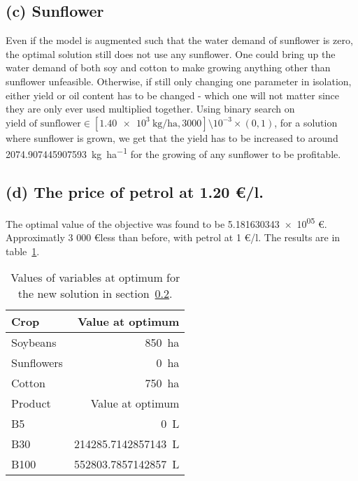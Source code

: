 \documentclass{article}
\begin{document}
\subsection{(c) Sunflower}
Even if the model is augmented such that
the water demand of sunflower is zero,
the optimal solution still does not use any sunflower.
One could bring up the water demand of both soy and cotton
to make growing anything other than sunflower unfeasible.
Otherwise, if still only changing one parameter in isolation,
either yield or oil content has to be changed -
which one will not matter since they are only ever used multiplied together.
Using binary search on
$\text{yield of sunflower} \in [\SI{1.40e3}{\kilo\gram\per\hectare}, 3000] \setminus 10^{-3} \times (0, 1)$,
for a solution where sunflower is grown,
we get that the yield has to be increased to around \SI[round-precision=6]{2074.907445907593}{\kilo\gram\per\hectare}
for the growing of any sunflower to be profitable.

\subsection{(d) The price of petrol at 1.20 \euro/l.}\label{sec:3d}
The optimal value of the objective was found to be
\num{5.181630343e+05} \euro. 
Approximatly 3 000 \euro less than before, with petrol at 1 \euro/l.
The results are in table~\ref{tab:new_values}.

\begin{table}
	\centering
	\caption{Values of variables at optimum for the new solution in section~\ref{sec:3d}. \label{tab:new_values}}
	\begin{tabular}{l r}
		\toprule
		Crop       & Value at optimum               \\
		\midrule
		Soybeans   & \SI{850}{\hectare}             \\
		Sunflowers & \SI{0}{\hectare}               \\
		Cotton     & \SI{750}{\hectare}             \\
		\bottomrule
		\toprule
		Product    & Value at optimum               \\
		\midrule
		B5         & \SI{0}{\liter}                 \\
		B30        & \SI{214285.7142857143}{\liter} \\
		B100       & \SI{552803.7857142857}{\liter} \\
		\bottomrule
	\end{tabular}
\end{table}
\end{document}
